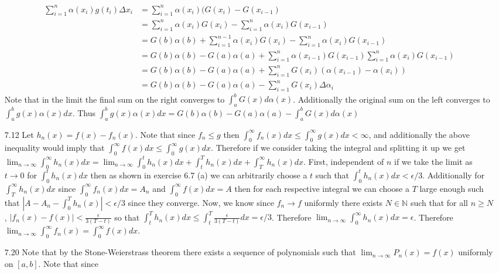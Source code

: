 \documentclass[12pt, letterpaper]{article}
\newcommand{\N}{\mathbb{N}}
\begin{document}
\begin{enumerate}
	\begin{align*}
	\sum_{i=1}^n \alpha(x_i)g(t_i)\Delta x_i &= \sum_{i=1}^n \alpha(x_i) (G(x_i)-G(x_{i-1})\\
	&= \sum_{i=1}^n \alpha(x_i)G(x_i) - \sum_{i=1}^n \alpha(x_i)G(x_{i-1})\\
	&= G(b)\alpha(b) + \sum_{i=1}^{n-1} \alpha(x_i)G(x_i)- \sum_{i=1}^n \alpha(x_i)G(x_{i-1})\\
	&= G(b)\alpha(b) - G(a)\alpha(a) + \sum_{i=1}^{n} \alpha(x_{i-1})G(x_{i-1})\sum_{i=1}^n \alpha(x_i)G(x_{i-1})\\
	&= G(b)\alpha(b) - G(a)\alpha(a) + \sum_{i=1}^{n} G(x_i) (\alpha(x_{i-1}) - \alpha(x_{i}))\\
	&= G(b)\alpha(b) - G(a)\alpha(a) - \sum_{i=1}^{n} G(x_i) \Delta \alpha_i
	\end{align*}
	Note that in the limit the final sum on the right converges to $\int_a^b G(x) d\alpha(x)$.  Additionally the original sum on the left converges to $\int_a^b g(x) \alpha(x) dx$.  Thus $\int_a^b g(x) \alpha(x) dx = G(b)\alpha(b) - G(a)\alpha(a) -\int_a^b G(x) d\alpha(x)$
	\item[7.12] Let $h_n(x) = f(x) - f_n(x)$.  Note that since $f_n \leq g$ then 
	$\int_0^\infty f_n(x) dx \leq \int_0^\infty g(x) dx < \infty$, and additionally
	the above inequality would imply that $\int_0^\infty f(x)dx \leq \int_0^\infty g(x) dx$.    Therefore if we consider taking the integral and splitting it up 
	we get $\lim_{n \to \infty} \int_0^\infty h_n(x) dx = 
	\lim_{n \to \infty} \int_0^t h_n(x) dx + \int_t^T h_n(x) dx + \int_T^\infty h_n(x) dx$.  First, independent of $n$ if we take the limit as $t \to 0$ for 
	$\int_0^t h_n(x) dx$ then as shown in exercise 6.7 (a) we can arbitrarily 
	choose a $t$ such that $\int_0^t h_n(x) dx < \epsilon/3$.  Additionally for 
	$\int_T^\infty h_n(x) dx$ since $\int_0^\infty f_n(x) dx = A_n$ and $\int_0^\infty f(x) dx = A$ then for each respective integral we can choose a $T$ 
	large enough such that $|A - A_n - \int_0^T h_n(x) | < \epsilon/3$ since they 
	converge.  Now, we know since $f_n \to f$ uniformly there exists $N\in \N$ 
	such that for all $n \geq N$, $|f_n(x) - f(x)| < \frac{\epsilon}{3(T-t)}$ so that 
	$\int_t^T h_n(x) dx \leq \int_t^T \frac{\epsilon}{3(T-t)} dx = \epsilon/3$.
	Therefore $\lim_{n \to \infty} \int_0^\infty h_n(x) dx = \epsilon$.  
	Therefore $\lim_{n \to \infty} \int_0^\infty f_n(x) = \int_0^\infty f(x) dx$.
	\item[7.20] Note that by the Stone-Weierstrass theorem there exists a sequence
	of polynomials such that $\lim_{n \to \infty} P_n(x) = f(x)$ uniformly on $[a,b]$.  Note that since

\end{enumerate}
\end{document}
